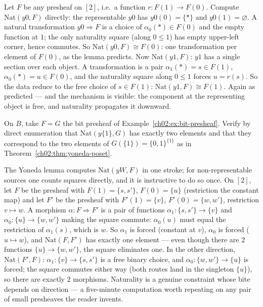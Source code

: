 \begin{example}\label{ch02:ex:yoneda-hand}
Let $F$ be any presheaf on $[2]$, i.e.\ a function
$r : F(1) \to F(0)$. Compute $\mathrm{Nat}(y0, F)$ directly: the
representable $y0$ has $y0(0) = \{\ast\}$ and $y0(1) = \varnothing$. A
natural transformation $y0 \Rightarrow F$ is a choice of
$\alpha_0(\ast) \in F(0)$ and the empty function at $1$; the only
naturality square (along $0 \le 1$) has empty upper-left corner, hence
commutes. So $\mathrm{Nat}(y0, F) \cong F(0)$: one transformation per
element of $F(0)$, as the lemma predicts. Now $\mathrm{Nat}(y1, F)$:
$y1$ has a single section over each object. A transformation is a pair
$\alpha_1(\ast) = s \in F(1)$, $\alpha_0(\ast) = u \in F(0)$, and the
naturality square along $0 \le 1$ forces $u = r(s)$. So the data
reduce to the free choice of $s \in F(1)$:
$\mathrm{Nat}(y1, F) \cong F(1)$. Again as predicted --- and the
mechanism is visible: the component at the representing object is
free, and naturality propagates it downward.
\end{example}

\begin{exercise}\label{ch02:exr:yoneda-square}
On $B$, take $F = G$ the bit presheaf of
Example~\ref{ch02:ex:bit-presheaf}. Verify by direct enumeration that
$\mathrm{Nat}(y\{1\}, G)$ has exactly two elements and that they
correspond to the two elements of $G(\{1\}) = \{0,1\}^{\{1\}}$ as in
Theorem~\ref{ch02:thm:yoneda-poset}.
\end{exercise}

\begin{example}\label{ch02:ex:count-nat}
The Yoneda lemma computes $\mathrm{Nat}(yW, F)$ in one stroke; for
non-representable sources one counts squares directly, and it is
instructive to do so once. On $[2]$, let $F$ be the presheaf with
$F(1) = \{s, s'\}$, $F(0) = \{u\}$ (restriction the constant map)
and let $F'$ be the presheaf with $F'(1) = \{v\}$,
$F'(0) = \{w, w'\}$, restriction $v \mapsto w$. A morphism
$\alpha : F \Rightarrow F'$ is a pair of functions
$\alpha_1 : \{s, s'\} \to \{v\}$ and
$\alpha_0 : \{u\} \to \{w, w'\}$ making the square commute:
$\alpha_0(u)$ must equal the restriction of $\alpha_1(s)$, which is
$w$. So $\alpha_1$ is forced (constant at $v$), $\alpha_0$ is forced
($u \mapsto w$), and $\mathrm{Nat}(F, F') $ has exactly one element
--- even though there are $2$ functions $\{u\} \to \{w, w'\}$, the
square eliminates one. In the other direction,
$\mathrm{Nat}(F', F)$: $\alpha_1 : \{v\} \to \{s, s'\}$ is a free
binary choice, and $\alpha_0 : \{w, w'\} \to \{u\}$ is forced; the
square commutes either way (both routes land in the singleton
$\{u\}$), so there are exactly $2$ morphisms. Naturality is a
genuine constraint whose bite depends on direction --- a five-minute
computation worth repeating on any pair of small presheaves the
reader invents.
\end{example}

